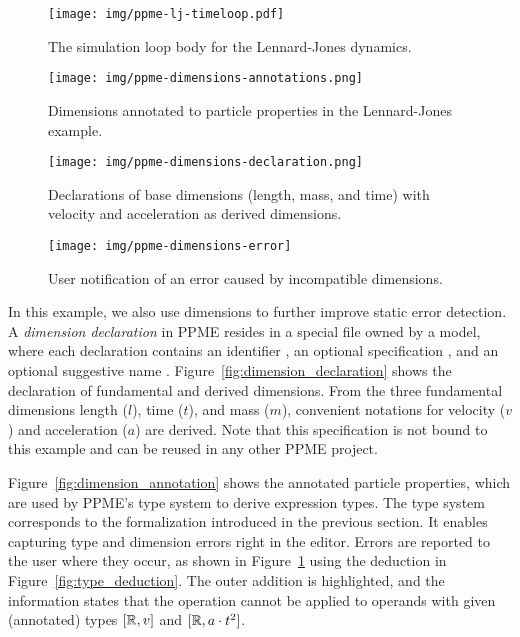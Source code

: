   \begin{figure}[tp]
    \centering
    \begin{minipage}[b]{.51\textwidth}
      \texttt{[image: img/ppme-lj-timeloop.pdf]}
      \caption{The simulation loop body for the Lennard-Jones dynamics.}
      \label{fig:ppme-lj-loop}
    \end{minipage}
    \hfill
    \begin{minipage}[b]{.48\textwidth}
      \centering
      \texttt{[image: img/ppme-dimensions-annotations.png]}%
      \caption{Dimensions annotated to particle properties in the Lennard-Jones example.}
      \label{fig:dimension_annotation}
      \vspace{6mm}
      \texttt{[image: img/ppme-dimensions-declaration.png]}
      \caption{Declarations of base dimensions (length, mass, and time) with velocity and acceleration as derived dimensions.}
      \label{fig:dimension_declaration}
     \vspace{6mm}
     \texttt{[image: img/ppme-dimensions-error]}
      \caption{User notification of an error caused by incompatible
      dimensions.}
       \label{fig:ppme-type_dimension_error}
      \end{minipage}
  \end{figure}

In this example, we also use dimensions to further improve static error detection.
A \emph{dimension declaration} in PPME resides in a special file owned 
by a model, where each declaration contains an identifier , an 
optional specification , and an optional suggestive name .
%
Figure~\ref{fig:dimension_declaration} shows the
declaration of fundamental and derived dimensions. From the three fundamental
dimensions length ($l$), time ($t$), and mass ($m$), convenient notations for
velocity ($v$) and acceleration ($a$) are derived. 
Note that this specification
is not bound to this example and can be reused in any other PPME project.

Figure~\ref{fig:dimension_annotation} shows the annotated particle properties,
which are used by PPME's type system to derive expression types. The  
type system corresponds to the formalization introduced in the previous section.
It enables capturing type and dimension errors right in the editor. Errors are reported 
to the user where they occur, as shown in Figure~\ref{fig:ppme-type_dimension_error}
using the deduction in Figure~\ref{fig:type_deduction}.
The outer addition is highlighted, and the information states that the operation cannot be applied
to operands with given (annotated) types  $[\mathbb{R}, v]$ and $[\mathbb{R}, a \cdot t^2]$. 
    
